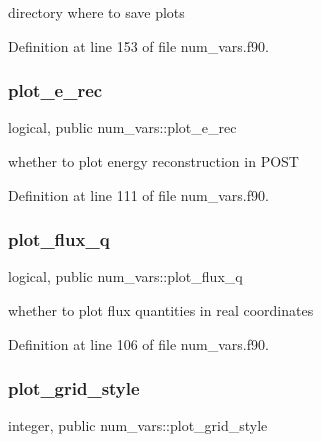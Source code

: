 directory where to save plots 



Definition at line 153 of file num\+\_\+vars.\+f90.

\mbox{\label{namespacenum__vars_ae90f876bc701020d565d6e77c4dc8c61}} 
\subsubsection{\texorpdfstring{plot\+\_\+e\+\_\+rec}{plot\_e\_rec}}
{\footnotesize\ttfamily logical, public num\+\_\+vars\+::plot\+\_\+e\+\_\+rec}



whether to plot energy reconstruction in P\+O\+ST 



Definition at line 111 of file num\+\_\+vars.\+f90.

\mbox{\label{namespacenum__vars_a3b821da571f91f9ec665538209b995a6}} 
\subsubsection{\texorpdfstring{plot\+\_\+flux\+\_\+q}{plot\_flux\_q}}
{\footnotesize\ttfamily logical, public num\+\_\+vars\+::plot\+\_\+flux\+\_\+q}



whether to plot flux quantities in real coordinates 



Definition at line 106 of file num\+\_\+vars.\+f90.

\mbox{\label{namespacenum__vars_a0e40187c6517fb55cc756c5656327fb9}} 
\subsubsection{\texorpdfstring{plot\+\_\+grid\+\_\+style}{plot\_grid\_style}}
{\footnotesize\ttfamily integer, public num\+\_\+vars\+::plot\+\_\+grid\+\_\+style}



